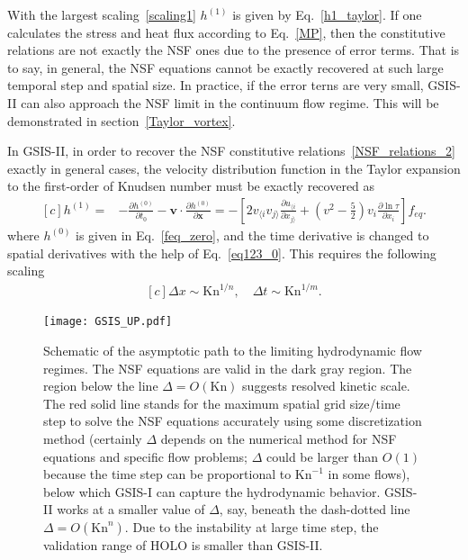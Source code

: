 \documentclass[onefignum,onetabnum]{siamart171218}
\begin{document}
With the largest scaling~\eqref{scaling1}  $h^{(1)}$ is given by Eq.~\eqref{h1_taylor}. If one calculates the stress and heat flux according to Eq.~\eqref{MP}, then the constitutive relations are not exactly the NSF ones due to the presence of error terms. That is to say, in general, the NSF equations cannot be exactly recovered at such large temporal step and spatial size. In practice, if the error terns are very small, GSIS-II can also approach the NSF limit in the continuum flow regime. This will be demonstrated in section~\ref{Taylor_vortex}.

In GSIS-II, in order to recover the NSF constitutive relations~\eqref{NSF_relations_2} exactly in general cases, 
the velocity distribution function in the Taylor expansion to the first-order of Knudsen number must be exactly recovered as 
\begin{equation}\label{h1_exact}
\begin{aligned}[c]
h^{(1)}=&-\frac{\partial h^{(0)}}{\partial t_0}
-\bm{v}\cdot\frac{\partial{h^{(0)}}}{\partial\bm{x}}=-\left[
2v_{\langle{i}}v_{j\rangle}
\frac{\partial u_{\langle{i}}}{\partial x_{j\rangle}}
+\left(v^2-\frac{5}{2}\right)v_i\frac{\partial \ln\tau}{\partial x_i}
\right]f_{eq}.
\end{aligned}
\end{equation}
where $ h^{(0)}$ is given in Eq.~\eqref{feq_zero}, and the time derivative is changed to spatial derivatives with the help of Eq.~\eqref{eq123_0}. This requires the following scaling
\begin{equation}\label{scaling2}
\begin{aligned}[c]
\Delta{x}\sim{\text{Kn}^{1/n}},\quad
\Delta{t}\sim{\text{Kn}^{1/m}}.
\end{aligned}
\end{equation}


\begin{figure}[t]
	\centering
	\texttt{[image: GSIS\_UP.pdf]}
	\caption{
		Schematic of the asymptotic path to the limiting hydrodynamic flow regimes. The NSF equations are valid in the dark gray region. The region below the line $\Delta=O(\text{Kn})$ suggests resolved kinetic scale. The
		red solid line stands for the maximum spatial grid size/time step to solve the NSF equations accurately using some discretization method (certainly $\Delta$ depends on the numerical method for NSF equations and specific flow problems; $\Delta$ could be larger than $O(1)$ because the time step can be proportional to $\text{Kn}^{-1}$ in some flows), below which GSIS-I can capture the hydrodynamic behavior. GSIS-II works at a smaller value of $\Delta$, say, beneath the dash-dotted line $\Delta=O(\text{Kn}^n)$. Due to the instability at large time step, the validation range of HOLO is smaller than GSIS-II.
	}
	\label{fig:GSIS_UP}
\end{figure}
\end{document}
